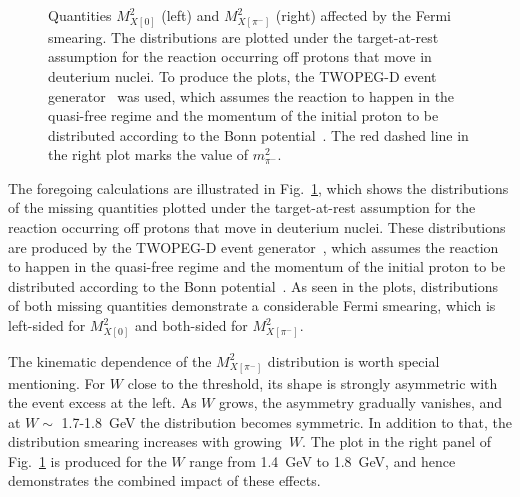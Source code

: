 \begin{figure}[htp]
\begin{center}
\caption{\small Quantities $M_{X[0]}^{2}$ (left) and $M_{X[\pi^{-}]}^{2}$ (right) affected by the Fermi smearing. The distributions are plotted under the target-at-rest assumption for the reaction occurring off protons that move in deuterium nuclei. To produce the plots, the TWOPEG-D event generator~\cite{twopeg-d} was used, which assumes the reaction to happen in the quasi-free regime and the momentum of the initial proton to be distributed according to the Bonn potential~\cite{Machleidt:1987hj}. The red dashed line in the right plot marks the value of $m_{\pi^{-}}^{2}$.} \label{fig:mm_fermi}
\end{center}
\end{figure}

The foregoing calculations are illustrated in Fig.~\ref{fig:mm_fermi}, which shows the distributions of the missing quantities plotted under the target-at-rest assumption for the reaction occurring off protons that move in deuterium nuclei. These distributions are produced by the TWOPEG-D event generator~\cite{twopeg-d}, which assumes the reaction to happen in the quasi-free regime and the momentum of the initial proton to be distributed according to the Bonn potential~\cite{Machleidt:1987hj}. As seen in the plots, distributions of both missing quantities demonstrate a considerable Fermi smearing, which is left-sided for $M_{X[0]}^{2}$ and both-sided for $M_{X[\pi^{-}]}^{2}$. 

The kinematic dependence of the $M_{X[\pi^{-}]}^{2}$ distribution is worth special mentioning. For $W$ close to the threshold, its shape is strongly asymmetric with the event excess at the left. As $W$ grows, the asymmetry gradually vanishes, and at $W\sim $ 1.7-1.8~GeV the distribution becomes symmetric. In addition to that, the distribution smearing increases with growing~$W$. The plot in the right panel of Fig.~\ref{fig:mm_fermi} is produced for the $W$ range from 1.4~GeV to 1.8~GeV, and hence demonstrates the combined impact of these effects.


